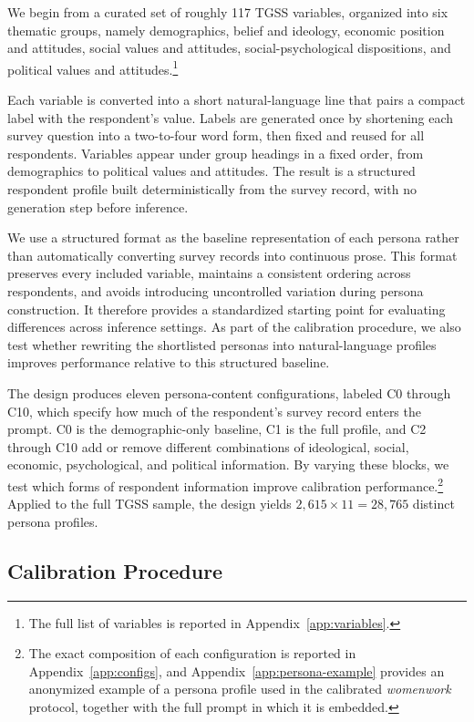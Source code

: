 We begin from a curated set of roughly 117 TGSS variables, organized into
six thematic groups, namely demographics, belief and ideology, economic
position and attitudes, social values and attitudes, social-psychological
dispositions, and political values and attitudes.\footnote{The full list of
variables is reported in Appendix~\ref{app:variables}.}

Each variable is converted into a short natural-language line that pairs a
compact label with the respondent's value. Labels are generated once by
shortening each survey question into a two-to-four word form, then fixed
and reused for all respondents. Variables appear under group headings in a
fixed order, from demographics to political values and attitudes. The
result is a structured respondent profile built deterministically from the
survey record, with no generation step before inference.

We use a structured format as the baseline representation of each persona
rather than automatically converting survey records into continuous prose.
This format preserves every included variable, maintains a consistent
ordering across respondents, and avoids introducing uncontrolled variation
during persona construction. It therefore provides a standardized starting
point for evaluating differences across inference settings. As part of the
calibration procedure, we also test whether rewriting the shortlisted
personas into natural-language profiles improves performance relative to
this structured baseline.

The design produces eleven persona-content configurations, labeled C0
through C10, which specify how much of the respondent's survey record
enters the prompt. C0 is the demographic-only baseline, C1 is the full
profile, and C2 through C10 add or remove different combinations of
ideological, social, economic, psychological, and political information. By
varying these blocks, we test which forms of respondent information improve
calibration performance.\footnote{The exact composition of each
configuration is reported in Appendix~\ref{app:configs}, and
Appendix~\ref{app:persona-example} provides an anonymized example of a
persona profile used in the calibrated \textit{womenwork} protocol,
together with the full prompt in which it is embedded.} Applied to the full
TGSS sample, the design yields $2{,}615 \times 11 = 28{,}765$ distinct
persona profiles.

\subsection{Calibration Procedure}
\label{sec:calibration-procedure}

